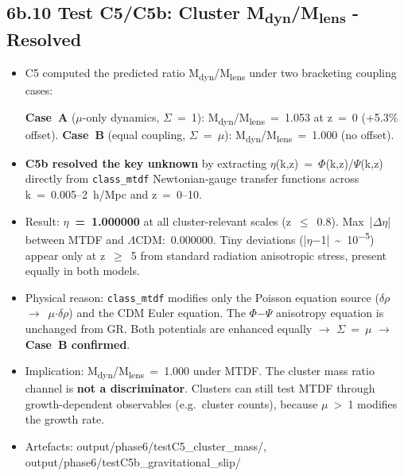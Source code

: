 \documentclass[11pt,a4paper]{article}
\begin{document}
\subsection{6b.10 Test C5/\allowbreak{}C5b: Cluster M\textsubscript{dyn}/M\textsubscript{lens}  -  Resolved}
\begin{itemize}
  \item C5 computed the predicted ratio M\textsubscript{dyn}/M\textsubscript{lens} under two bracketing coupling cases:
    
\textbf{Case~A} ($\mu$-only dynamics, $\Sigma$~=~1): M\textsubscript{dyn}/M\textsubscript{lens}~=~1.053 at z~=~0 (+5.3\% offset).
\textbf{Case~B} (equal coupling, $\Sigma$~=~$\mu$): M\textsubscript{dyn}/M\textsubscript{lens}~=~1.000 (no offset).
  \item \textbf{C5b resolved the key unknown} by extracting $\eta$(k,z)~=~$\Phi$(k,z)/$\Psi$(k,z) directly from \texttt{class\_\allowbreak{}mtdf} Newtonian-gauge transfer functions across k~=~0.005--2~h/\allowbreak{}Mpc and z~=~0--10.
  \item Result: \textbf{$\eta$~=~1.000000} at all cluster-relevant scales (z~$\le$~0.8). Max~|$\Delta$$\eta$| between MTDF and $\Lambda$CDM:~0.000000. Tiny deviations (|$\eta$$-$1|~\~{}~10\textsuperscript{$-$5}) appear only at z~$\ge$~5 from standard radiation anisotropic stress, present equally in both models.
  \item Physical reason: \texttt{class\_\allowbreak{}mtdf} modifies only the Poisson equation source ($\delta$$\rho$~$\rightarrow$~$\mu$$\cdot$$\delta$$\rho$) and the CDM Euler equation. The $\Phi$$-$$\Psi$ anisotropy equation is unchanged from GR. Both potentials are enhanced equally $\rightarrow$ $\Sigma$~=~$\mu$ $\rightarrow$ \textbf{Case~B confirmed}.
  \item Implication: M\textsubscript{dyn}/M\textsubscript{lens}~=~1.000 under MTDF. The cluster mass ratio channel is \textbf{not a discriminator}. Clusters can still test MTDF through growth-dependent observables (e.g.~cluster counts), because $\mu$~>~1 modifies the growth rate.
  \item Artefacts: output/\allowbreak{}phase6/\allowbreak{}testC5\_\allowbreak{}cluster\_\allowbreak{}mass/\allowbreak{}, output/\allowbreak{}phase6/\allowbreak{}testC5b\_\allowbreak{}gravitational\_\allowbreak{}slip/\allowbreak{}
\end{itemize}
\end{document}
